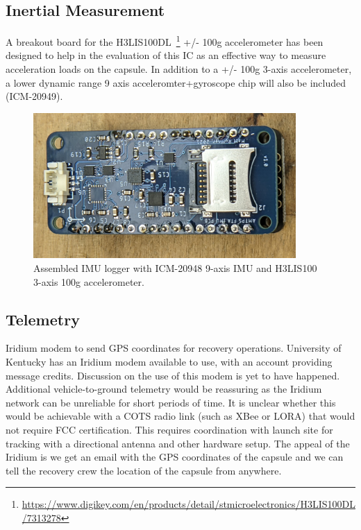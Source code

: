 \documentclass{article}
\begin{document}
\subsection{Inertial Measurement}
A breakout board for the H3LIS100DL~\footnote{\url{https://www.digikey.com/en/products/detail/stmicroelectronics/H3LIS100DL/7313278}} +/- 100g accelerometer has been designed to help in the evaluation of this IC as an effective way to measure acceleration loads on the capsule. In addition to a +/- 100g 3-axis accelerometer, a lower dynamic range 9 axis acceleromter+gyroscope chip will also be included (ICM-20949).

\begin{figure}[H]
	\centering
	\includegraphics[width=10cm]{images/imu-breakout}
	\caption{Assembled IMU logger with ICM-20948 9-axis IMU and H3LIS100 3-axis 100g accelerometer.}
	\label{fig:imu-breakout}
\end{figure}

\subsection{Telemetry}

Iridium modem to send GPS coordinates for recovery operations. University of Kentucky has an Iridium modem available to use, with an account providing message credits. Discussion on the use of this modem is yet to have happened. Additional vehicle-to-ground telemetry would be reassuring as the Iridium network can be unreliable for short periods of time. It is unclear whether this would be achievable with a COTS radio link (such as XBee or LORA) that would not require FCC certification. This requires coordination with launch site for tracking with a directional antenna and other hardware setup. The appeal of the Iridium is we get an email with the GPS coordinates of the capsule and we can tell the recovery crew the location of the capsule from anywhere. 
\end{document}
